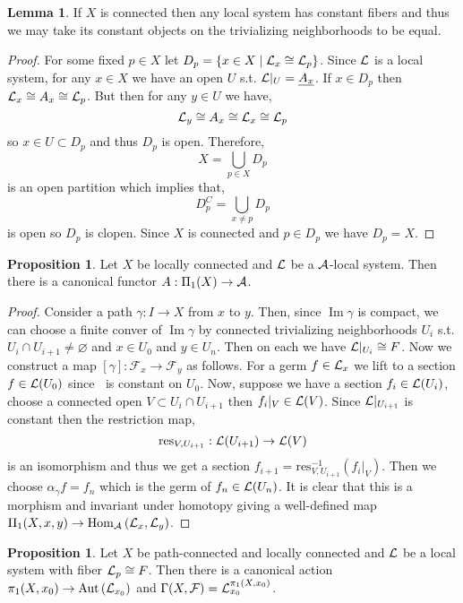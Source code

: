 \documentclass[12pt]{extarticle}
\DeclareMathOperator{\im}{\mathrm{Im}}
\newcommand{\catHom}[3]{\mathrm{Hom}_{#1}\left( #2, #3 \right)}
\theoremstyle{definition}
\newtheorem{lemma}[theorem]{Lemma}
\newtheorem{proposition}[theorem]{Proposition}
\newcommand{\res}{\mathrm{res}}
\newcommand{\F}{\mathcal{F}}
\newcommand{\Aut}[1]{\mathrm{Aut}\left(#1 \right)}
\begin{document}
\begin{lemma}
If $X$ is connected then any local system has constant fibers and thus we may take its constant objects on the trivializing neighborhoods to be equal.
\end{lemma}

\begin{proof}
For some fixed $p \in X$ let $D_p = \{ x \in X \mid \mathcal{L}_x \cong \mathcal{L}_p \}$. Since $\mathcal{L}$ is a local system, for any $x \in X$ we have an open $U$ s.t. $\mathcal{L} |_U = \underline{A_x}$. If $x \in D_p$ then $\mathcal{L}_x \cong A_x \cong \mathcal{L}_p$. But then for any $y \in U$ we have,
\[ \mathcal{L}_y \cong A_x \cong \mathcal{L}_x \cong \mathcal{L}_p \]
so $x \in U \subset D_p$ and thus $D_p$ is open. Therefore,
\[ X = \bigcup_{p \in X} D_p \]
is an open partition which implies that,
\[ D_p^C = \bigcup_{x \neq p} D_p \]
is open so $D_p$ is clopen. Since $X$ is connected and $p \in D_p$ we have $D_p = X$. 
\end{proof}


\begin{proposition}
Let $X$ be locally connected and $\mathcal{L}$ be a $\mathcal{A}$-local system. Then there is a canonical functor $A : \Pi_1(X) \to \mathcal{A}$. 
\end{proposition}

\begin{proof}
Consider a path $\gamma : I \to X$ from $x$ to $y$. Then, since $\im{\gamma}$ is compact, we can choose a finite conver of $\im{\gamma}$ by connected trivializing neighborhoods $U_i$ s.t. $U_i \cap U_{i+1} \neq \varnothing$ and $x \in U_0$ and $y \in U_n$. Then on each we have $\mathcal{L} |_{U_i} \cong F$. Now we construct a map $[\gamma] : \F_{x} \to \F_{y}$ as follows. For a germ $f \in \mathcal{L}_{x}$ we lift to a section $f \in \mathcal{L}(U_0)$ since $\:$ is constant on $U_0$. Now, suppose we have a section $f_i \in \mathcal{L}(U_i)$, choose a connected open $V \subset U_i \cap U_{i+1}$ then $f_i |_V \in \mathcal{L}(V)$. Since $\mathcal{L} |_{U_{i+1}}$ is constant then the restriction map,
\[ \res_{V, U_{i+1}} : \L(U_{i+1}) \to \L(V) \]
is an isomorphism and thus we get a section $f_{i+1} = \res_{V, U_{i+1}}^{-1}(f_i |_V)$. Then we choose $\alpha_\gamma f = f_n$ which is the germ of $f_n \in \mathcal{L}(U_n)$. It is clear that this is a morphism and invariant under homotopy giving a well-defined map $\Pi_1(X, x, y) \to \catHom{\A}{\L_{x}}{\L_{y}}$. 
\end{proof}

\begin{proposition}
Let $X$ be path-connected and locally connected and $\mathcal{L}$ be a local system with fiber $\mathcal{L}_p \cong F$. Then there is a canonical action $\pi_1(X, x_0) \to \Aut{\L_{x_0}}$ and $\Gamma(X, \F) = \L_{x_0}^{\pi_1(X, x_0)}$.
\end{proposition}
\end{document}
